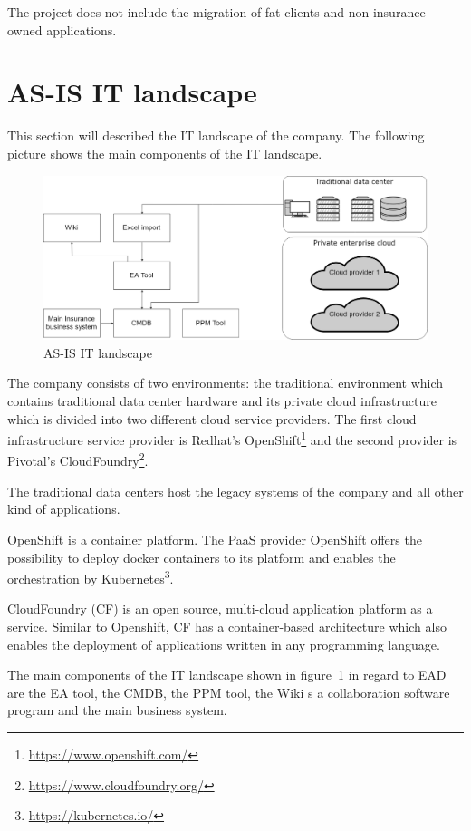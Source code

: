 The project does not include the migration of fat clients and non-insurance-owned applications.

\section{AS-IS IT landscape}\label{section:asislandscape}

This section will described the IT landscape of the company. The following picture shows the main components of the IT landscape.

\begin{figure}[htpb]
  \centering
  \includegraphics[width=1.0\textwidth]{figures/as-is-it-landscape.png}
  \caption{ AS-IS IT landscape}
  \label{fig:AS-IS IT landscape}
\end{figure}

The company consists of two environments: the traditional environment which contains traditional data center hardware and its private cloud infrastructure which is divided into two different cloud service providers. The first cloud infrastructure service provider is Redhat's OpenShift\footnote{\url{https://www.openshift.com/}} and the second provider is Pivotal's CloudFoundry\footnote{\url{https://www.cloudfoundry.org/}}.

The traditional data centers host the legacy systems of the company and all other kind of applications.

OpenShift is a container platform. The PaaS provider OpenShift offers the possibility to deploy docker containers to its platform and enables the orchestration by Kubernetes\footnote{\url{https://kubernetes.io/}}.

CloudFoundry (CF) is an open source, multi-cloud application platform as a service. Similar to Openshift, CF has a container-based architecture which also enables the deployment of applications written in any programming language.

The main components of the IT landscape shown in figure~\ref{fig:AS-IS IT landscape} in regard to EAD are the EA tool, the CMDB, the PPM tool, 
the Wiki s a collaboration software program and the main business system. 

